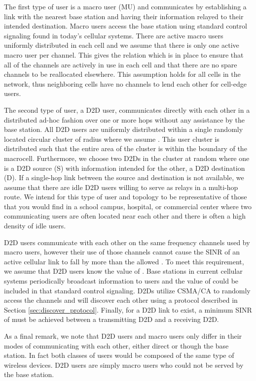 \documentclass[10pt, final, journal, letterpaper,oneside, twocolumn]{IEEEtran}
\begin{document}
The first type of user is a macro user (MU) and communicates by establishing a link with the nearest base station and having their information relayed to their intended destination.  Macro users access the base station using standard control signaling found in today's cellular systems.  There are  active macro users uniformly distributed in each cell and we assume that there is only one active macro user per channel.  This gives the relation  which is in place to ensure that all of the  channels are actively in use in each cell and that there are no spare channels to be reallocated elsewhere.  This assumption holds for all cells in the network, thus neighboring cells have no channels to lend each other for cell-edge users.  

The second type of user, a D2D user, communicates directly with each other in a distributed  ad-hoc fashion over one or more hops without any assistance by the base station.  All D2D users are uniformly distributed within a single randomly located circular cluster of radius  where we assume .  This user cluster is distributed such that the entire area of the cluster is within the boundary of the macrocell.  Furthermore, we choose two D2Ds in the cluster at random where one is a D2D source (S) with information intended for the other, a D2D destination (D).  If a single-hop link between the source and destination is not available, we assume that there are  idle D2D users willing to serve as relays in a multi-hop route.  We intend for this type of user and topology to be representative of those that you would find in a school campus, hospital, or commercial center where two communicating users are often located near each other and there is often a high density of idle users. 

D2D users communicate with each other on the same frequency channels used by macro users, however their use of those channels cannot cause the SINR of an active cellular link to fall by more than the allowed .  To meet this requirement, we assume that D2D users know the value of .  Base stations in current cellular systems periodically broadcast information to users and the value of  could be included in that standard control signaling.  D2Ds utilize CSMA/CA to randomly access the channels and will discover each other using a protocol described in Section \ref{sec:discover_protocol}.  Finally, for a D2D link to exist, a minimum SINR of  must be achieved between a transmitting D2D and a receiving D2D.  

As a final remark, we note that D2D users and macro users only differ in their modes of communicating with each other, either direct or though the base station.  In fact both classes of users would be composed of the same type of wireless devices.  D2D users are simply macro users who could not be served by the base station.  
\end{document}
